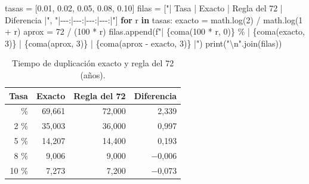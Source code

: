 \documentclass[
  spanish,
  letterpaper,
  a4paper,
  11pt,
  oneside,
  numbers=noenddot]{scrbook}
\newenvironment{Shaded}{\begin{snugshade}}{\end{snugshade}}
\newcommand{\BuiltInTok}[1]{\textcolor[rgb]{0.00,0.23,0.31}{#1}}
\newcommand{\CharTok}[1]{\textcolor[rgb]{0.13,0.47,0.30}{#1}}
\newcommand{\ControlFlowTok}[1]{\textcolor[rgb]{0.00,0.23,0.31}{\textbf{#1}}}
\newcommand{\DecValTok}[1]{\textcolor[rgb]{0.68,0.00,0.00}{#1}}
\newcommand{\FloatTok}[1]{\textcolor[rgb]{0.68,0.00,0.00}{#1}}
\newcommand{\KeywordTok}[1]{\textcolor[rgb]{0.00,0.23,0.31}{\textbf{#1}}}
\newcommand{\NormalTok}[1]{\textcolor[rgb]{0.00,0.23,0.31}{#1}}
\newcommand{\OperatorTok}[1]{\textcolor[rgb]{0.37,0.37,0.37}{#1}}
\newcommand{\SpecialCharTok}[1]{\textcolor[rgb]{0.37,0.37,0.37}{#1}}
\newcommand{\SpecialStringTok}[1]{\textcolor[rgb]{0.13,0.47,0.30}{#1}}
\newcommand{\StringTok}[1]{\textcolor[rgb]{0.13,0.47,0.30}{#1}}
\theoremstyle{definition}
\theoremstyle{plain}
\theoremstyle{definition}
\theoremstyle{definition}
\theoremstyle{plain}
\theoremstyle{remark}
\begin{document}
\begin{Shaded}
\begin{Highlighting}[]
\NormalTok{tasas }\OperatorTok{=}\NormalTok{ [}\FloatTok{0.01}\NormalTok{, }\FloatTok{0.02}\NormalTok{, }\FloatTok{0.05}\NormalTok{, }\FloatTok{0.08}\NormalTok{, }\FloatTok{0.10}\NormalTok{]}
\NormalTok{filas }\OperatorTok{=}\NormalTok{ [}\StringTok{"| Tasa | Exacto | Regla del 72 | Diferencia |"}\NormalTok{, }\StringTok{"|{-}{-}{-}:|{-}{-}{-}:|{-}{-}{-}:|{-}{-}{-}:|"}\NormalTok{]}
\ControlFlowTok{for}\NormalTok{ r }\KeywordTok{in}\NormalTok{ tasas:}
\NormalTok{    exacto }\OperatorTok{=}\NormalTok{ math.log(}\DecValTok{2}\NormalTok{) }\OperatorTok{/}\NormalTok{ math.log(}\DecValTok{1} \OperatorTok{+}\NormalTok{ r)}
\NormalTok{    aprox }\OperatorTok{=} \DecValTok{72} \OperatorTok{/}\NormalTok{ (}\DecValTok{100} \OperatorTok{*}\NormalTok{ r)}
\NormalTok{    filas.append(}\SpecialStringTok{f"| }\SpecialCharTok{\{}\NormalTok{coma(}\DecValTok{100} \OperatorTok{*}\NormalTok{ r, }\DecValTok{0}\NormalTok{)}\SpecialCharTok{\}}\SpecialStringTok{ \% | }\SpecialCharTok{\{}\NormalTok{coma(exacto, }\DecValTok{3}\NormalTok{)}\SpecialCharTok{\}}\SpecialStringTok{ | }\SpecialCharTok{\{}\NormalTok{coma(aprox, }\DecValTok{3}\NormalTok{)}\SpecialCharTok{\}}\SpecialStringTok{ | }\SpecialCharTok{\{}\NormalTok{coma(aprox }\OperatorTok{{-}}\NormalTok{ exacto, }\DecValTok{3}\NormalTok{)}\SpecialCharTok{\}}\SpecialStringTok{ |"}\NormalTok{)}
\BuiltInTok{print}\NormalTok{(}\StringTok{"}\CharTok{\textbackslash{}n}\StringTok{"}\NormalTok{.join(filas))}
\end{Highlighting}
\end{Shaded}

{

\begin{longtable}[]{@{}rrrr@{}}

\caption{\label{tbl-regla-72}Tiempo de duplicación exacto y regla del 72
(años).}

\tabularnewline

\toprule\noalign{}
Tasa & Exacto & Regla del 72 & Diferencia \\
\midrule\noalign{}
\endhead
\bottomrule\noalign{}
\endlastfoot
1 \% & 69,661 & 72,000 & 2,339 \\
2 \% & 35,003 & 36,000 & 0,997 \\
5 \% & 14,207 & 14,400 & 0,193 \\
8 \% & 9,006 & 9,000 & −0,006 \\
10 \% & 7,273 & 7,200 & −0,073 \\

\end{longtable}

}
\end{document}
